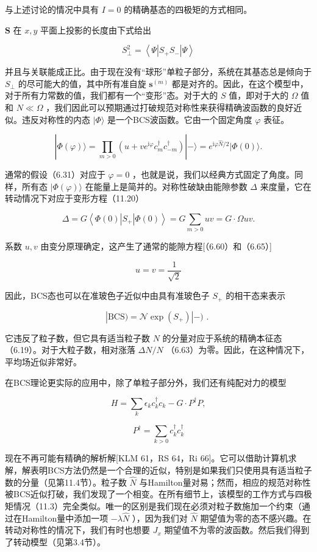 与上述讨论的情况中具有 $I=0$ 的精确基态的四极矩的方式相同。

$\boldsymbol{S}$ 在 $x,y$ 平面上投影的长度由下式给出

\[
{S}^{2}_{\bot}=\left\langle {\Psi\left|{{S}_{+}{S}_{-}}\right|\Psi}\right\rangle \tag{11.21}
\]

并且与关联能成正比。由于现在没有“球形”单粒子部分，系统在其基态总是倾向于 ${S}_{\bot}$ 的尽可能大的值，其中所有准自旋
${\boldsymbol{s}}^{\left(m\right)}$ 都是对齐的。因此，在这个模型中，对于所有力常数的值，我们都有一个“变形”态。对于大的
$S$ 值，即对于大的 $\Omega$ 值和 $N\ll\Omega$ ，我们因此可以预期通过打破规范对称性来获得精确波函数的良好近似。违反对称性的内态
$|\Phi\rangle$ 是一个BCS波函数。它由一个固定角度 $\varphi$ 表征。

\[
|\Phi(\varphi)\rangle=\mathop{\prod}\limits_{m>0}\left(u+ve^{\mathrm{i}\varphi}c^{\dagger}_{m}c^{\dagger}_{-m}\right)|-\rangle=e^{\mathrm{i}\varphi\widehat{N}/2}|\Phi(0)\rangle.\tag{11.22}
\]

通常的假设（6.31）对应于 $\varphi=0$ ，也就是说，我们以经典方式固定了角度。同样，所有态 $|\Phi\left(\varphi\right)\rangle$
在能量上是简并的。对称性破缺由能隙参数 $\Delta$ 来度量，它在转动情况下对应于变形方程（11.20）

\[
\Delta=G\left\langle {\Phi\left(0\right)\left|{S}_{+}\right|\Phi\left(0\right)}\right\rangle =G\mathop{\sum}\limits_{{m>0}}{uv}=G\cdot{\Omega uv}.\tag{11.23}
\]

系数 $u,v$ 由变分原理确定，这产生了通常的能隙方程{[}（6.60）和（6.65）{]}

\[
u=v=\frac{1}{\sqrt{2}}\tag{11.24}
\]

因此，BCS态也可以在准玻色子近似中由具有准玻色子 ${S}_{+}$ 的相干态来表示

\[
|\mathrm{BCS})=\mathcal{N}\exp(S_{+})|-)\text{ . }\tag{11.25}
\]

它违反了粒子数，但它具有适当粒子数 $N$ 的分量对应于系统的精确本征态（6.19）。对于大粒子数，相对涨落 ${\Delta N}/N$
（6.63）为零。因此，在这种情况下，平均场近似非常好。

在BCS理论更实际的应用中，除了单粒子部分外，我们还有纯配对力的模型

\[
H=\mathop{\sum}\limits_{k}{\epsilon}_{k}c^{\dagger}_{k}{c}_{k}-G\cdot P^{\dagger}P,\tag{11.26}
\]

\[
P^{\dagger}=\mathop{\sum}\limits_{{k>0}}c^{\dagger}_{k}c^{\dagger}_{k}
\]

现在不再可能有精确的解析解{[}KLM 61，RS 64，Ri 66{]}。它可以借助计算机求解，解表明BCS方法仍然是一个合理的近似，特别是如果我们只使用具有适当粒子数的分量（见第11.4节）。粒子数
$\widehat{N}$ 与Hamilton量对易；然而，相应的规范对称性被BCS近似打破，我们发现了一个相变。在所有细节上，该模型的工作方式与四极矩情况（11.3）完全类似。唯一的区别是我们现在必须对粒子数施加一个约束（通过在Hamilton量中添加一项
$-\lambda\widehat{N}$ ），因为我们对 $\widehat{N}$ 期望值为零的态不感兴趣。在转动对称性的情况下，我们有时也想要
${J}_{x}$ 期望值不为零的波函数。然后我们得到了转动模型（见第3.4节）。

